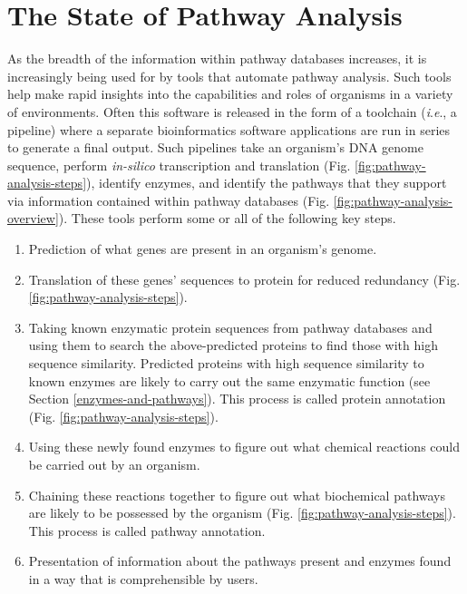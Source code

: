 \section{The State of Pathway Analysis}

As the breadth of the information within pathway databases increases, it is 
increasingly being used for by tools that automate pathway analysis. Such tools 
help make rapid insights into the capabilities and roles of organisms in a 
variety of environments. Often this software is released in the form of a 
toolchain (\textit{i}.\textit{e}., a pipeline) where a separate bioinformatics software 
applications are run in series to generate a final output. Such pipelines take 
an organism's DNA genome sequence, perform \textit{in-silico} transcription and 
translation (Fig. \ref{fig:pathway-analysis-steps}), identify enzymes, and 
identify the pathways that they support via information contained within pathway 
databases (Fig. \ref{fig:pathway-analysis-overview}). These tools perform some 
or all of the following key steps.

\begin{enumerate}
\item Prediction of what genes are present in an organism's genome.
\item Translation of these genes' sequences to protein for reduced redundancy 
(Fig. \ref{fig:pathway-analysis-steps}).
\item Taking known enzymatic protein sequences from pathway databases and using 
them to search the above-predicted proteins to find those with high sequence 
similarity. Predicted proteins with high sequence similarity to known enzymes 
are likely to carry out the same enzymatic function (see Section 
\ref{enzymes-and-pathways}). This process is called protein annotation (Fig. 
\ref{fig:pathway-analysis-steps}).
\item Using these newly found enzymes to figure out what chemical reactions 
could be carried out by an organism.
\item Chaining these reactions together to figure out what biochemical pathways 
are likely to be possessed by the organism (Fig. 
\ref{fig:pathway-analysis-steps}). This process is called pathway annotation.
\item Presentation of information about the pathways present and enzymes found 
in a way that is comprehensible by users.
\end{enumerate}

